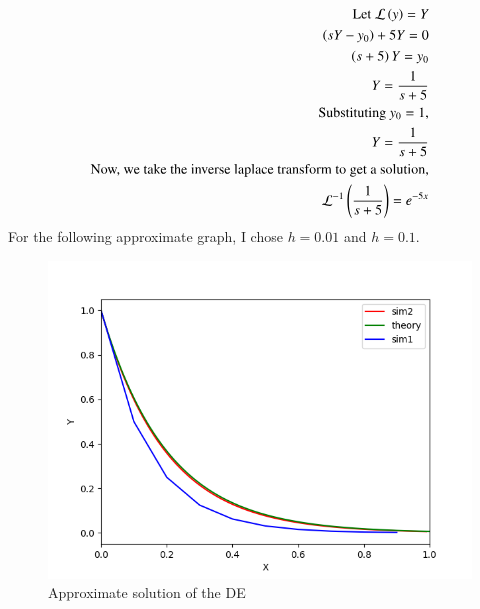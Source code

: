 \documentclass[journal]{IEEEtran}
\begin{document}
\begin{align}
    \text{Let } \mathcal{L}\left(y\right) = Y\\
    \left(sY - y_0\right) +5Y = 0\\
    \left(s + 5\right)Y = y_0\\
    Y = \frac{1}{s + 5}\\
    \text{Substituting $y_0 = 1$},\\
    Y = \frac{1}{s + 5}\\
    \text{Now, we take the inverse laplace transform to get a solution,}\\
    \mathcal{L}^{-1}\left(\frac{1}{s+5}\right) = e^{-5x}
\end{align}
For the following approximate graph, I chose $h = 0.01$ and $h = 0.1$.
\begin{figure}[h!]
   \centering
   \includegraphics[width=0.7\columnwidth]{figs/fig.png}
    \caption{Approximate solution of the DE}
\end{figure}
\end{document}
